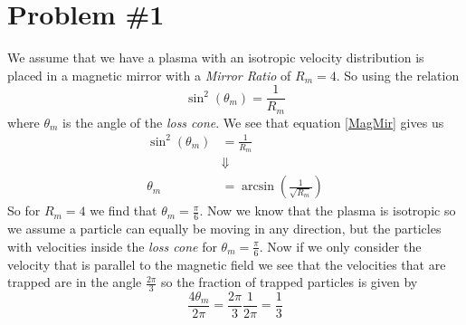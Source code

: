 \documentclass[11pt]{article}
\numberwithin{equation}{section}
\begin{document}


\section{Problem \#1}
We assume that we have a plasma with an isotropic velocity distribution is placed in a magnetic mirror with a \emph{Mirror Ratio} of $R_m = 4$. So using the relation 
\begin{equation}
\sin^2(\theta_m) = \frac{1}{R_m}
\label{MagMir}
\end{equation}
where $\theta_m$ is the angle of the \emph{loss cone}. We see that equation \ref{MagMir} gives us
\begin{align*}
\sin^2(\theta_m) &= \frac{1}{R_m}\\
&\Downarrow\\
\theta_m &= \arcsin\left(\frac{1}{\sqrt{R_m}}\right)
\end{align*}
So for $R_m=4$ we find that $\theta_m = \frac{\pi}{6}$. Now we know that the plasma is isotropic so we assume a particle can equally be moving in any direction, but the particles with velocities inside the \emph{loss cone} for $\theta_m=\frac{\pi}{6}$. Now if we only consider the velocity that is parallel to the magnetic field we see that the velocities that are trapped are in the angle $\frac{2\pi}{3}$ so the fraction of trapped particles is given by
$$\frac{4\theta_m}{2\pi} = \frac{2\pi}{3}\frac{1}{2\pi} = \frac{1}{3}$$
\end{document}
